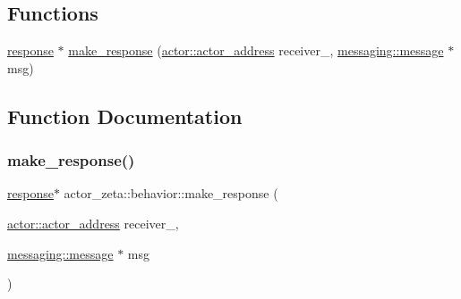 \subsection*{Functions}
\begin{DoxyCompactItemize}
\item 
\hyperlink{classactor__zeta_1_1behavior_1_1response}{response} $\ast$ \hyperlink{namespaceactor__zeta_1_1behavior_a0d5ffba04135f8d77932d12a774c6231}{make\+\_\+response} (\hyperlink{classactor__zeta_1_1actor_1_1actor__address}{actor\+::actor\+\_\+address} receiver\+\_\+, \hyperlink{classactor__zeta_1_1messaging_1_1message}{messaging\+::message} $\ast$msg)
\end{DoxyCompactItemize}


\subsection{Function Documentation}
\mbox{\label{namespaceactor__zeta_1_1behavior_a0d5ffba04135f8d77932d12a774c6231}} 
\subsubsection{\texorpdfstring{make\+\_\+response()}{make\_response()}}
{\footnotesize\ttfamily \hyperlink{classactor__zeta_1_1behavior_1_1response}{response}$\ast$ actor\+\_\+zeta\+::behavior\+::make\+\_\+response (\begin{DoxyParamCaption}\item[{\hyperlink{classactor__zeta_1_1actor_1_1actor__address}{actor\+::actor\+\_\+address}}]{receiver\+\_\+,  }\item[{\hyperlink{classactor__zeta_1_1messaging_1_1message}{messaging\+::message} $\ast$}]{msg }\end{DoxyParamCaption})\hspace{0.3cm}{\ttfamily [inline]}}

